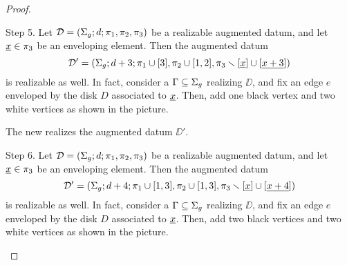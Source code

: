 \begin{proof}
\def\picturesetup{
\begin{pgfonlayer}{graph edge below}
\begin{scope}
\clip (-.8,0) to[bend left=90,looseness=1.5] (.8,0) to[bend left=90] (-.8,0);
\fill[disk 1] circle(3);
\draw[disk 1 boundary enveloped,line width=\edgelinewidth] (-.5,0) pic{black vertex} to (.5,0) pic {white vertex};
\path[black edge] (-.5,0) to (-1,0);
\path[black edge] (.5,0) to (1,0);
\end{scope}
\end{pgfonlayer}
}
\begin{sideline}{Step 5.}
Let $\mathcal{D}=(\Sigma_{g};d;\pi_1,\pi_2,\pi_3)$ be a realizable augmented datum, and let $\underline{x}\in\pi_3$ be an enveloping element. Then the augmented datum
\[
\mathcal{D}'=(\Sigma_{g};d+3;\pi_1\cup[3],\pi_2\cup[1,2],\pi_3\smallsetminus[\underline{x}]\cup[\underline{x+3}])
\]
is realizable as well. In fact, consider a \dessin{} $\Gamma\subseteq\Sigma_{g}$ realizing $\DD$, and fix an edge $e$ enveloped by the disk $D$ associated to $\underline{x}$. Then, add one black vertex and two white vertices as shown in the picture.
\begin{center}
\end{center}
The new \dessin{} realizes the augmented datum $\DD'$.
\end{sideline}
\begin{sideline}{Step 6.}
Let $\mathcal{D}=(\Sigma_{g};d;\pi_1,\pi_2,\pi_3)$ be a realizable augmented datum, and let $\underline{x}\in\pi_3$ be an enveloping element. Then the augmented datum
\[
\mathcal{D}'=(\Sigma_{g};d+4;\pi_1\cup[1,3],\pi_2\cup[1,3],\pi_3\smallsetminus[\underline{x}]\cup[\underline{x+4}])
\]
is realizable as well. In fact, consider a \dessin{} $\Gamma\subseteq\Sigma_{g}$ realizing $\DD$, and fix an edge $e$ enveloped by the disk $D$ associated to $\underline{x}$. Then, add two black vertices and two white vertices as shown in the picture.

\end{sideline}
\end{proof}
